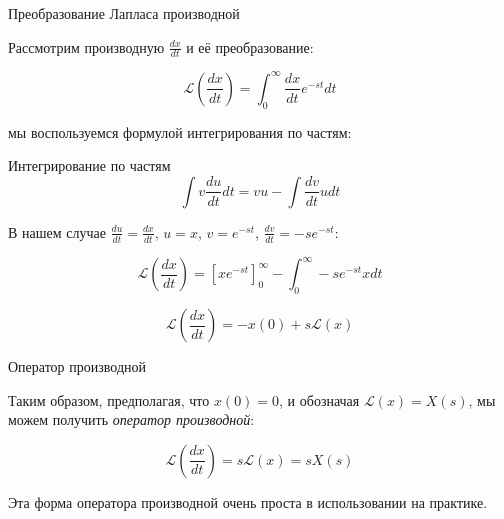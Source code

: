 \documentclass{beamer}
\begin{document}
\begin{frame}{Преобразование Лапласа производной}
	\begin{flushleft}
		
		Рассмотрим производную $\frac{dx}{dt}$ и её преобразование:
		
		\begin{equation}
			\mathcal{L}\left(\frac{dx}{dt}\right) = \int_0^\infty \frac{dx}{dt} e^{-st}dt
		\end{equation}
		
		мы воспользуемся формулой интегрирования по частям:
		
		\begin{block}{Интегрирование по частям}
			\begin{equation}
				\int v \frac{du}{dt} dt = vu - 
				\int \frac{dv}{dt} u dt    
			\end{equation}
		\end{block}
		
		В нашем случае $\frac{du}{dt} = \frac{dx}{dt}$, $u = x$, $v = e^{-st}$, $\frac{dv}{dt} = -se^{-st}$:
		
		\begin{equation}
			\mathcal{L}\left(\frac{dx}{dt}\right) = \left[x e^{-st} \right]_0^\infty - 
			\int_0^\infty -se^{-st} x dt  
		\end{equation}
		
		\begin{equation}
			\mathcal{L}\left(\frac{dx}{dt}\right) = -x(0) + s\mathcal{L}(x)  
		\end{equation}
		
	\end{flushleft}
\end{frame}




\begin{frame}{Оператор производной}
	\begin{flushleft}
		
		Таким образом, предполагая, что $x(0) = 0$, и обозначая $\mathcal{L}\left( x \right) = X(s)$, мы можем получить \emph{оператор производной}:
		
		\begin{equation}
			\label{eq:NoIC_laplace}
			\mathcal{L}\left(\frac{dx}{dt}\right) = s \mathcal{L}\left(x\right) = s X(s)
		\end{equation}
		
		\bigskip
		
		Эта форма оператора производной очень проста в использовании на практике.
		
	\end{flushleft}
\end{frame}
\end{document}
